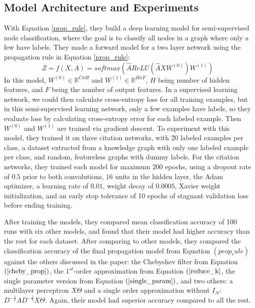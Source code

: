 \subsection{Model Architecture and Experiments}
With Equation \ref{prop_rule}, they build a deep learning model for semi-supervised node classification, where the goal is to classify all nodes in a graph where only a few have labels. They made a forward model for a two layer network using the propagation rule in Equation \ref{prop_rule}:
\begin{equation}
\label{forward_model}
Z = f(X, A) = softmax(\hat{A} ReLU(\hat{A}XW^{(0)})W^{(1)})
\end{equation}
In this model, $W^{(0)} \in \mathbb{R}^{C x H}$ and $W^{(1)} \in \mathbb{R}^{H x F}$, $H$ being number of hidden features, and $F$ being the number of output features.
In a supervised learning network, we could then calculate cross-entropy loss for all training examples, but in this semi-supervised learning network, only a few examples have labels, so they evaluate loss by calculating cross-entropy error for each labeled example. Then $W^{(0)}$ and $W^{(1)}$ are trained via gradient descent.
To experiment with this model, they trained it on three citation networks, with 20 labeled examples per class, a dataset extracted from a knowledge graph with only one labeled example per class, and random, featureless graphs with dummy labels. For the citation networks, they trained each model for maximum $200$ epochs, using a dropout rate of $0.5$ prior to both convolutions, $16$ units in the hidden layer, the Adam optimizer, a learning rate of $0.01$, weight decay of $0.0005$, Xavier weight initialization, and an early stop tolerance of 10 epochs of stagnant validation loss before ending training. 

After training the models, they compared mean classification accuracy of 100 runs with six other models, and found that their model had higher accuracy than the rest for each dataset. After comparing to other models, they compared the classification accuracy of the final propagation model from Equation $(prop_rule)$ against the others discussed in the paper: the Chebyshev filter from Equation $(\ref{cheby_prop})$, the $1^{st}$-order approximation from Equation $(\ref{reduce_k}$, the single parameter version from Equation $(\ref{single_param})$, and two others: a multilayer perceptron $X\Theta$ and a single order approximation without $I_N$: 
$D^{-\frac{1}{2}}AD^{-\frac{1}{2}}X\Theta $. Again, their model had superior accuracy compared to all the rest.

